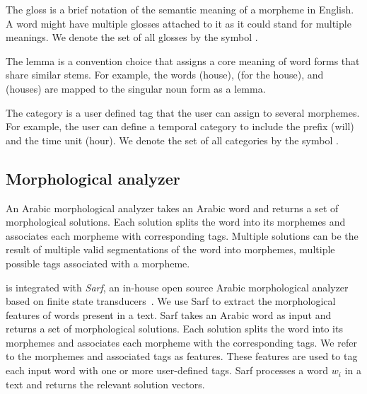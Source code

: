 The gloss is a brief notation of the semantic meaning of a morpheme in English. 
A word might have multiple glosses attached to it as it could stand for multiple meanings. 
We denote the set of all glosses by the symbol \GG.

The lemma is a convention choice that assigns a core meaning of word forms that share similar stems. 
For example, the words (house), 
(for the house), 
and (houses) are mapped to the singular noun form  as a lemma.

The category is a user defined tag that the user can assign to several 
morphemes.
For example, the user can define a temporal category to include the 
prefix  (will) and the time unit  (hour). 
We denote the set of all categories by the symbol \AC.

\subsection{Morphological analyzer}

An Arabic morphological analyzer takes an Arabic word 
and returns a set of morphological solutions. 
Each solution splits the word into its morphemes and 
associates each morpheme with corresponding tags. 
Multiple solutions can be the result of multiple valid 
segmentations of the word into morphemes, multiple 
possible tags associated with a morpheme.

\framework is integrated with {\em Sarf}, 
an in-house open source Arabic morphological analyzer based on 
finite state transducers~\cite{ZaMaColing2012DemosSarf}. 
We use Sarf to extract the morphological features of words present in a text. 
Sarf takes an Arabic word as input and returns a set of morphological solutions. 
Each solution splits the word into its morphemes and associates each morpheme with the corresponding tags. 
We refer to the morphemes and associated tags as features. 
These features are used to tag each input word with one or more user-defined tags. 
Sarf processes a word $w_{i}$ in a text and returns the relevant solution vectors. 

